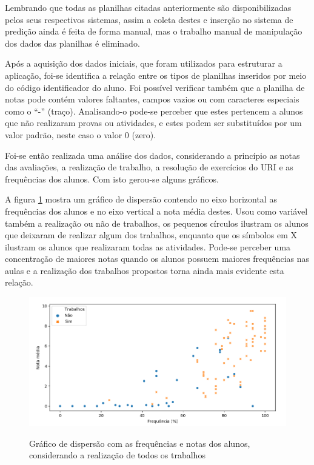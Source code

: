 Lembrando que todas as planilhas citadas anteriormente são disponibilizadas pelos seus respectivos sistemas, assim a coleta destes e inserção no sistema de predição ainda é feita de forma manual, mas o trabalho manual de manipulação dos dados das planilhas é eliminado.

Após a aquisição dos dados iniciais, que foram utilizados para estruturar a aplicação, foi-se identifica a relação entre os tipos de planilhas inseridos por meio do código identificador do aluno.
Foi possível verificar também que a planilha de notas pode contém valores faltantes, campos vazios ou com caracteres especiais como o ``-'' (traço). 
Analisando-o pode-se perceber que estes pertencem a alunos que não realizaram provas ou atividades, e estes podem ser substituídos por um valor padrão, neste caso o valor 0 (zero).

Foi-se então realizada uma análise dos dados, considerando a princípio as notas das avaliações, a realização de trabalho, a resolução de exercícios do URI e as frequências dos alunos. 
Com isto gerou-se alguns gráficos.

A figura \ref{fig:analise-1} mostra um gráfico de dispersão contendo no eixo horizontal as frequências dos alunos e no eixo vertical a nota média destes. 
Usou como variável também a realização ou não de trabalhos, os pequenos círculos ilustram os alunos que deixaram de realizar algum dos trabalhos, enquanto que os símbolos em X ilustram os alunos que realizaram todas as atividades. 
Pode-se perceber uma concentração de maiores notas quando os alunos possuem maiores frequências nas aulas e a realização dos trabalhos propostos torna ainda mais evidente esta relação.

\begin{figure}[!htb]
    \centering
    \caption{Gráfico de dispersão com as frequências e notas dos alunos, considerando a realização de todos os trabalhos}
    \includegraphics[width=1\textwidth]{./dados/figuras/analise/grafico1}
    \label{fig:analise-1}
\end{figure}

